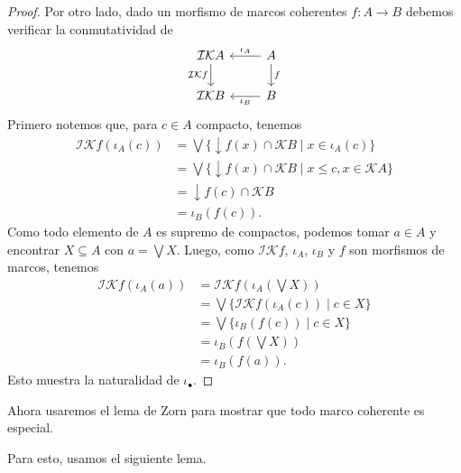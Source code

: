 \documentclass[12pt,letterpaper,titlepage]{article}
\theoremstyle{definition}
\newcommand\Sup{\bigvee}
\newcommand\down{{\downarrow}}
\renewcommand\cal[1]{\mathcal{#1}}
\newcommand\<{\langle}
\renewcommand\>{\rangle}
\begin{document}
\begin{proof}
    Por otro lado, dado un morfismo de marcos coherentes
    $f:A\to B$ debemos verificar la conmutatividad de
    \[
        \begin{tikzcd}
            \cal I\cal KA
                \ar[d,"\cal I\cal Kf"']
            & A \ar[d,"f"]
                \ar[l,"\iota_A"'] \\
            \cal I\cal KB & B \ar[l,"\iota_B"] 
        \end{tikzcd}
    \]
    Primero notemos que, para $c\in A$ compacto, tenemos
    \begin{align*}
        \cal I\cal Kf(\iota_A(c))
        &= \Sup\{\down f(x)\cap\cal KB\mid x\in\iota_A(c)\} \\
        &= \Sup\{\down f(x)\cap\cal KB\mid x\leq c,x\in\cal KA\} \\
        &= \down f(c)\cap\cal KB \\
        &= \iota_B(f(c)).
    \end{align*}
    Como todo elemento de $A$ es supremo de compactos,
    podemos tomar $a\in A$ y encontrar $X\subseteq A$
    con $a=\Sup X$.
    Luego, como $\cal I\cal Kf$, $\iota_A$, $\iota_B$ y $f$
    son morfismos de marcos, tenemos
    \begin{align*}
        \cal I\cal Kf(\iota_A(a))
        &= \cal I\cal Kf(\iota_A(\Sup X)) \\
        &= \Sup\{\cal I\cal Kf(\iota_A(c))\mid c\in X\} \\
        &= \Sup\{\iota_B(f(c))\mid c\in X\} \\
        &= \iota_B(f(\Sup X)) \\
        &= \iota_B(f(a)).
    \end{align*}
    Esto muestra la naturalidad de $\iota_\bullet$.
\end{proof}

Ahora usaremos el lema de Zorn para mostrar
que todo marco coherente es especial.

Para esto, usamos el siguiente lema.
\end{document}
